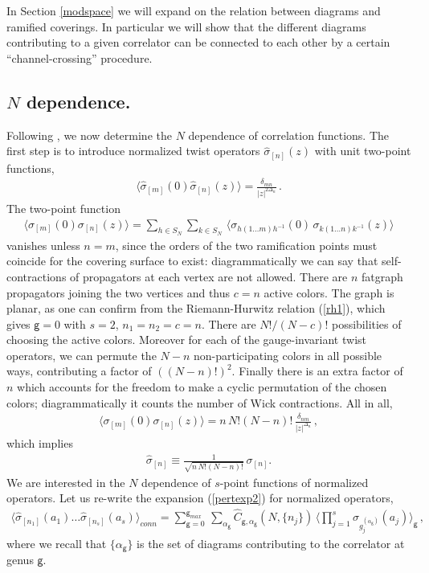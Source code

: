 \documentclass[letterpaper]{JHEP3}
\def\s{\sigma}
\def\a{\alpha}
\def\be{\begin{equation}}
\def\ee{\end{equation}}
\def\a{\alpha}
\def\be{\begin{eqnarray}}
\def\ee{\end{eqnarray}}
\def\gg{\mathsf g }
\begin{document}
In Section \ref{modspace} we will expand on the relation between diagrams and ramified coverings. In particular we will
show that the different diagrams contributing to a given correlator can be connected to each other by a certain
``channel-crossing'' procedure.


\subsection{$N$ dependence.}\label{largeNsec}

Following \cite{Jevicki:1998bm, Lunin:2000yv}, we now determine the $N$ dependence of correlation functions. The first step
is to introduce normalized twist operators $\hat \sigma_{[n]} (z)$ with unit
two-point functions,
\be
\langle \hat \s_{[m]}(0) \hat \s_{[n]}(z)\rangle =\frac{ \delta_{mn}}{{|z|^{2 \Delta_n} } }\,.
\ee  
The two-point function
\be
\langle\s_{[m]}(0)\s_{[n]}(z)\rangle = \sum_{h \in S_N} \sum_{k \in S_N} \, \langle  \sigma_{h (1\dots m) h^{-1} }  (0) \, \sigma_{k (1\dots n) k^{-1} } (z) \rangle
\ee
 vanishes unless $n=m$, since the orders of  the two ramification
points must coincide for the covering surface to exist:
diagrammatically we can say that self-contractions of propagators at each vertex are not allowed.
There are $n$ fatgraph propagators joining the two vertices and thus $c = n$ active colors.
The graph is planar, as one can confirm from the Riemann-Hurwitz relation (\ref{rh1}), which gives $\gg = 0$ 
with $s=2$, $n_1 = n_2 = c= n$. 
There are $N!/(N-c)!$ possibilities of choosing the active colors. Moreover
for each of the gauge-invariant twist operators, we  can permute
the $N-n$ non-participating colors in all possible ways, contributing a factor of $((N-n)!)^2$. Finally
there is an extra  factor of $n$ which accounts for the freedom to make
a cyclic permutation of the chosen colors; diagrammatically it counts the number
of Wick contractions. All in all,
\be
\langle\s_{[m]}(0)\s_{[n]}(z)\rangle =n\,N!(N-n)! \, \frac{\delta_{nm}}{|z|^{\Delta_n}}\, ,
\ee 
which implies
\be\label{nor}
\hat\s_{[n]}\equiv\frac{1}{\sqrt{n\,N!(N-n)!}}\, \s_{[n]}.
\ee
We are interested in the  $N$ dependence of $s$-point functions of normalized operators. Let us re-write
the expansion (\ref{pertexp2}) for normalized operators,
\be\label{pertexp3}
\langle \hat \s_{[n_1]} (a_1)  \dots \hat \s_{[n_s]} (a_s) \rangle_{conn} =
\sum_{\gg=0}^{\gg_{max}}\, \sum_{\a_\gg} \hat C_{\gg,\a_\gg}(N,\{n_j\})\,\langle\prod_{j=1}^s\s_{g_j^{(\a_\gg)}}(a_j)\rangle_{\gg} \, ,
\ee 
where we recall that $\{ \alpha_\gg \}$ is the set of diagrams contributing to the correlator at genus $\gg$.
\end{document}
